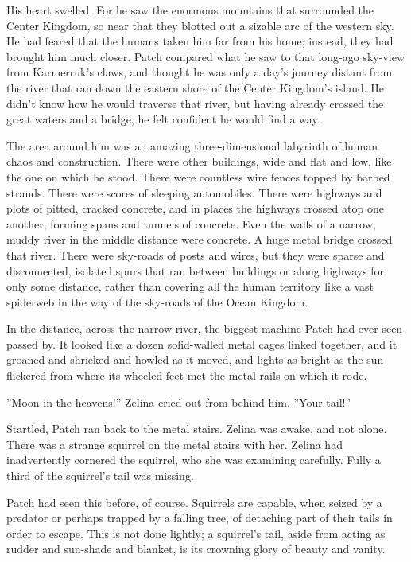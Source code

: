 \documentclass[12pt]{book}
\begin{document}
His heart swelled. For he saw the enormous mountains that surrounded the Center Kingdom, so near that they blotted out a sizable arc of the western sky. He had feared that the humans taken him far from his home; instead, they had brought him much closer. Patch compared what he saw to that long-ago sky-view from Karmerruk's claws, and thought he was only a day's journey distant from the river that ran down the eastern shore of the Center Kingdom's island. He didn't know how he would traverse that river, but having already crossed the great waters and a bridge, he felt confident he would find a way.

The area around him was an amazing three-dimensional labyrinth of human chaos and construction. There were other buildings, wide and flat and low, like the one on which he stood. There were countless wire fences topped by barbed strands. There were scores of sleeping automobiles. There were highways and plots of pitted, cracked concrete, and in places the highways crossed atop one another, forming spans and tunnels of concrete. Even the walls of a narrow, muddy river in the middle distance were concrete. A huge metal bridge crossed that river. There were sky-roads of posts and wires, but they were sparse and disconnected, isolated spurs that ran between buildings or along highways for only some distance, rather than covering all the human territory like a vast spiderweb in the way of the sky-roads of the Ocean Kingdom.

In the distance, across the narrow river, the biggest machine Patch had ever seen passed by. It looked like a dozen solid-walled metal cages linked together, and it groaned and shrieked and howled as it moved, and lights as bright as the sun flickered from where its wheeled feet met the metal rails on which it rode.

''Moon in the heavens!'' Zelina cried out from behind him. ''Your tail!'' 

Startled, Patch ran back to the metal stairs. Zelina was awake, and not alone. There was a strange squirrel on the metal stairs with her. Zelina had inadvertently cornered the squirrel, who she was examining carefully. Fully a third of the squirrel's tail was missing.

Patch had seen this before, of course. Squirrels are capable, when seized by a predator or perhaps trapped by a falling tree, of detaching part of their tails in order to escape. This is not done lightly; a squirrel's tail, aside from acting as rudder and sun-shade and blanket, is its crowning glory of beauty and vanity.
\end{document}
